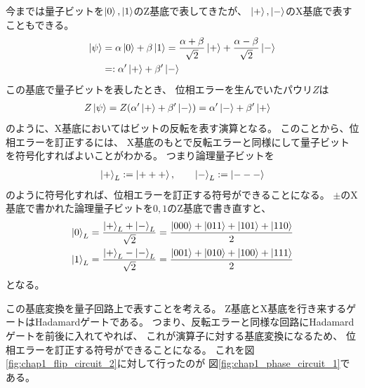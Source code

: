 \documentclass[../master.tex]{subfiles}
\begin{document}
今までは量子ビットを\(\ket{0},\ket{1}\)のZ基底で表してきたが、
\(\ket{+},\ket{-}\)のX基底で表すこともできる。
\begin{equation}\begin{aligned}[b]
    \ket{\psi} &= \alpha\ket{0}+\beta\ket{1}
    = \frac{\alpha+\beta}{\sqrt{2}}\ket{+}+\frac{\alpha-\beta}{\sqrt{2}}\ket{-}\\
    &=: \alpha'\ket{+}+\beta'\ket{-}
\end{aligned}\end{equation}
この基底で量子ビットを表したとき、
位相エラーを生んでいたパウリ\(Z\)は
\begin{equation}\begin{aligned}[b]
    Z\ket{\psi} &= Z(\alpha'\ket{+}+\beta'\ket{-}) = \alpha'\ket{-}+\beta'\ket{+}
\end{aligned}\end{equation}
のように、X基底においてはビットの反転を表す演算となる。
このことから、位相エラーを訂正するには、
X基底のもとで反転エラーと同様にして量子ビットを符号化すればよいことがわかる。
つまり論理量子ビットを
\begin{equation}\begin{aligned}[b]
    \ket{+}_L := \ket{+++},\qquad \ket{-}_L := \ket{---}
\end{aligned}\end{equation}
のように符号化すれば、位相エラーを訂正する符号ができることになる。
\(\pm\)のX基底で書かれた論理量子ビットを\(0,1\)のZ基底で書き直すと、
\begin{equation}\begin{aligned}[b]
    \ket{0}_L &= \frac{\ket{+}_L+\ket{-}_L}{\sqrt{2}}
        =\frac{\ket{000}+\ket{011}+\ket{101}+\ket{110}}{2}\\
    \ket{1}_L &= \frac{\ket{+}_L-\ket{-}_L}{\sqrt{2}}
        =\frac{\ket{001}+\ket{010}+\ket{100}+\ket{111}}{2}
\end{aligned}\end{equation}
となる。

この基底変換を量子回路上で表すことを考える。
Z基底とX基底を行き来するゲートはHadamardゲートである。
つまり、反転エラーと同様な回路にHadamardゲートを前後に入れてやれば、
これが演算子に対する基底変換になるため、
位相エラーを訂正する符号ができることになる。
これを図\ref{fig:chap1_flip_circuit_2}に対して行ったのが
図\ref{fig:chap1_phase_circuit_1}である。
\end{document}
